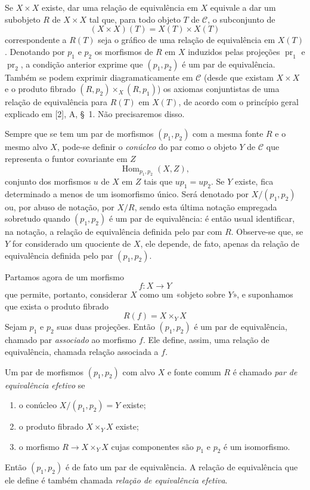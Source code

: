 \documentclass[11pt,twoside,openany]{book}
\numberwithin{equation}{section}
\newcommand{\src}[1]{%
  \phantomsection\hypertarget{src:#1}{}%
  \marginpar{\raggedleft\footnotesize\sffamily #1}%
}
\theoremstyle{plain}
\theoremstyle{definition}
\theoremstyle{remark}
\newcommand{\FgaUnitKey}{frontmatter}
\renewcommand{\src}[1]{%
  \phantomsection\hypertarget{src:\FgaUnitKey:#1}{}%
  \marginpar{\raggedleft\footnotesize\sffamily #1}%
}
\begin{document}
Se $X\times X$ existe, dar uma relação de equivalência em $X$ equivale a dar um
subobjeto $R$ de $X\times X$ tal que, para todo objeto $T$ de $\mathcal C$, o
subconjunto de
\[
  (X\times X)(T)=X(T)\times X(T)
\]
correspondente a $R(T)$ seja o gráfico de uma relação de equivalência em
$X(T)$. Denotando por $p_1$ e $p_2$ os morfismos de $R$ em $X$ induzidos pelas
projeções $\operatorname{pr}_1$ e $\operatorname{pr}_2$, a condição anterior
exprime que $(p_1,p_2)$ é um par de equivalência. Também se podem exprimir
diagramaticamente em $\mathcal C$ (desde que existam $X\times X$ e o produto
fibrado $(R,p_2)\times_X(R,p_1)$) os axiomas conjuntistas de uma relação de
equivalência para $R(T)$ em $X(T)$, de acordo com o princípio geral
explicado em [2], A, \S~1. Não precisaremos disso.

Sempre que se tem um par de morfismos $(p_1,p_2)$ com a mesma fonte $R$ e o
mesmo alvo $X$, pode-se definir o \emph{conúcleo} do par como o objeto $Y$ de
$\mathcal C$ que representa o funtor covariante em $Z$
\[
  \operatorname{Hom}_{p_1,p_2}(X,Z),
\]
conjunto dos morfismos $u$ de $X$ em $Z$ tais que $up_1=up_2$. Se $Y$ existe,
fica determinado a menos de um isomorfismo único. Será denotado por
$X/(p_1,p_2)$ ou, por abuso de notação, por $X/R$, sendo esta última notação
empregada sobretudo quando
\src{101}$(p_1,p_2)$ é um par de equivalência: é então usual identificar,
na notação, a relação de equivalência definida pelo par com $R$. Observe-se
que, se $Y$ for considerado um quociente de $X$, ele depende, de fato, apenas
da relação de equivalência definida pelo par $(p_1,p_2)$.

Partamos agora de um morfismo
\[
  f:X\longrightarrow Y
\]
que permite, portanto, considerar $X$ como um «objeto sobre $Y$», e suponhamos
que exista o produto fibrado
\[
  R(f)=X\times_Y X
\]
Sejam $p_1$ e $p_2$ suas duas projeções. Então $(p_1,p_2)$ é um par de
equivalência, chamado par \emph{associado} ao morfismo $f$. Ele define, assim,
uma relação de equivalência, chamada relação associada a $f$.

Um par de morfismos $(p_1,p_2)$ com alvo $X$ e fonte comum $R$ é chamado
\emph{par de equivalência efetivo} se
\begin{enumerate}
  \item[(i)] o conúcleo $X/(p_1,p_2)=Y$ existe;
  \item[(ii)] o produto fibrado $X\times_Y X$ existe;
  \item[(iii)] o morfismo $R\longrightarrow X\times_Y X$ cujas componentes são
  $p_1$ e $p_2$ é um isomorfismo.
\end{enumerate}
Então $(p_1,p_2)$ é de fato um par de equivalência. A relação de equivalência
que ele define é também chamada \emph{relação de equivalência efetiva}.
\end{document}

